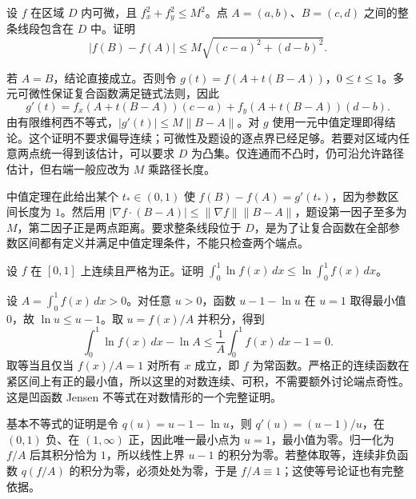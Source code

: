 \documentclass[UTF8,12pt,a4paper,fontset=fandol]{ctexart}
\begin{document}
\begin{example}\label{nm-2018-5}
设 $f$ 在区域 $D$ 内可微，且 $f_x^2+f_y^2\leq M^2$。点 $A=(a,b)$、$B=(c,d)$ 之间的整条线段包含在 $D$ 中。证明
\[
 |f(B)-f(A)|\leq M\sqrt{(c-a)^2+(d-b)^2}.
\]
\end{example}
\begin{solve}
若 $A=B$，结论直接成立。否则令 $g(t)=f(A+t(B-A))$，$0\leq t\leq1$。多元可微性保证复合函数满足链式法则，因此
\[
 g'(t)=f_x(A+t(B-A))(c-a)+f_y(A+t(B-A))(d-b).
\]
由有限维柯西不等式，$|g'(t)|\leq M\|B-A\|$。对 $g$ 使用一元中值定理即得结论。这个证明不要求偏导连续；可微性及题设的逐点界已经足够。若要对区域内任意两点统一得到该估计，可以要求 $D$ 为凸集。仅连通而不凸时，仍可沿允许路径估计，但右端一般应改为 $M$ 乘路径长度。

中值定理在此给出某个 $t_*\in(0,1)$ 使 $f(B)-f(A)=g'(t_*)$，因为参数区间长度为 $1$。然后用 $|\nabla f\cdot(B-A)|\le\|\nabla f\|\|B-A\|$，题设第一因子至多为 $M$，第二因子正是两点距离。要求整条线段位于 $D$，是为了让复合函数在全部参数区间都有定义并满足中值定理条件，不能只检查两个端点。

\end{solve}

\begin{example}\label{nm-2018-6}
设 $f$ 在 $[0,1]$ 上连续且严格为正。证明 $\displaystyle\int_0^1\ln f(x)\,dx\leq\ln\int_0^1f(x)\,dx$。
\end{example}
\begin{solve}
设 $A=\int_0^1f(x)\,dx>0$。对任意 $u>0$，函数 $u-1-\ln u$ 在 $u=1$ 取得最小值0，故 $\ln u\leq u-1$。取 $u=f(x)/A$ 并积分，得到
\[
 \int_0^1\ln f(x)\,dx-\ln A
 \leq\frac1A\int_0^1f(x)\,dx-1=0.
\]
取等当且仅当 $f(x)/A=1$ 对所有 $x$ 成立，即 $f$ 为常函数。严格正的连续函数在紧区间上有正的最小值，所以这里的对数连续、可积，不需要额外讨论端点奇性。这是凹函数 Jensen 不等式在对数情形的一个完整证明。

基本不等式的证明是令 $q(u)=u-1-\ln u$，则 $q'(u)=(u-1)/u$，在 $(0,1)$ 负、在 $(1,\infty)$ 正，因此唯一最小点为 $u=1$，最小值为零。归一化为 $f/A$ 后其积分恰为 $1$，所以线性上界 $u-1$ 的积分为零。若整体取等，连续非负函数 $q(f/A)$ 的积分为零，必须处处为零，于是 $f/A\equiv1$；这使等号论证也有完整依据。

\end{solve}
\end{document}
